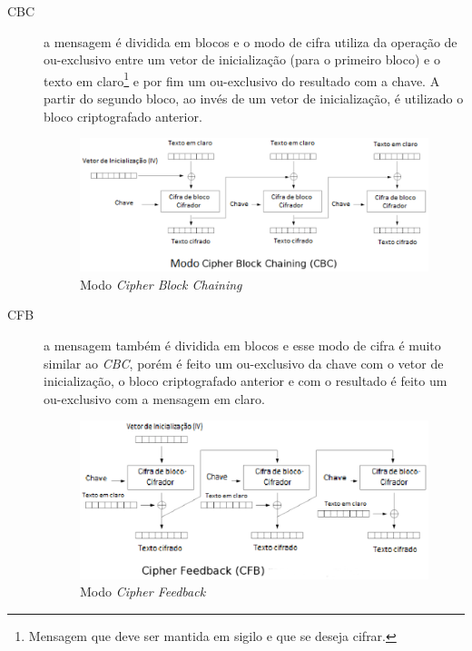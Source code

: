 \begin{description}
\begin{figure}[h]
\end{figure} 
\item[CBC] a mensagem é dividida em blocos e o modo de cifra utiliza da operação de ou-exclusivo entre um vetor de inicialização (para o primeiro bloco) e o texto em claro\footnote{Mensagem que deve ser mantida em sigilo e que se deseja cifrar.} e por fim um ou-exclusivo do resultado com a chave. A partir do segundo bloco, ao invés de um vetor de inicialização, é utilizado o bloco criptografado anterior.
\begin{figure}[h]
\centering
\includegraphics[keepaspectratio=true,scale=0.8]
    {figuras/cbc.eps}
    \caption[Modo Cipher Block Chaining]{Modo \textit{Cipher Block Chaining}\protect\footnotemark}
\end{figure} 
\item[CFB] a mensagem também é dividida em blocos e esse modo de cifra é muito similar ao \textit{CBC}, porém é feito um ou-exclusivo da chave com o vetor de inicialização, o bloco criptografado anterior e com o resultado é feito um ou-exclusivo com a mensagem em claro.
\begin{figure}[h]
\centering
\includegraphics[keepaspectratio=true,scale=0.8]
    {figuras/cfb.eps}
    \caption[Modo Cipher Feedback]{Modo \textit{Cipher Feedback} \protect\footnotemark} 

\end{figure}
\end{description}
